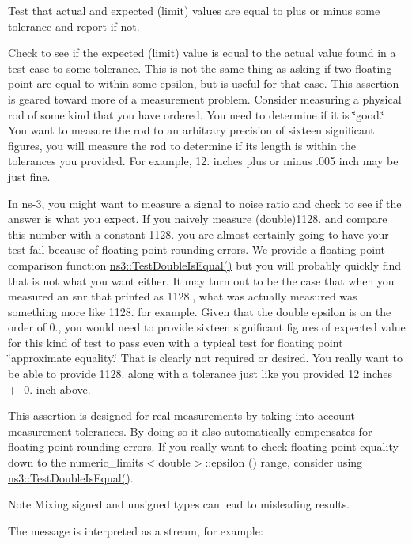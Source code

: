 Test that actual and expected (limit) values are equal to plus or minus some tolerance and report if not. 

Check to see if the expected (limit) value is equal to the actual value found in a test case to some tolerance. This is not the same thing as asking if two floating point are equal to within some epsilon, but is useful for that case. This assertion is geared toward more of a measurement problem. Consider measuring a physical rod of some kind that you have ordered. You need to determine if it is \char`\"{}good.\char`\"{} You want to measure the rod to an arbitrary precision of sixteen significant figures, you will measure the rod to determine if its length is within the tolerances you provided. For example, 12. inches plus or minus .005 inch may be just fine.

In ns-\/3, you might want to measure a signal to noise ratio and check to see if the answer is what you expect. If you naively measure (double)1128. and compare this number with a constant 1128. you are almost certainly going to have your test fail because of floating point rounding errors. We provide a floating point comparison function \hyperlink{group__testing_ga13a5d60f4d34641d7e2fd799f2c4d952}{ns3\+::\+Test\+Double\+Is\+Equal()} but you will probably quickly find that is not what you want either. It may turn out to be the case that when you measured an snr that printed as 1128., what was actually measured was something more like 1128. for example. Given that the double epsilon is on the order of 0., you would need to provide sixteen significant figures of expected value for this kind of test to pass even with a typical test for floating point \char`\"{}approximate
equality.\char`\"{} That is clearly not required or desired. You really want to be able to provide 1128. along with a tolerance just like you provided 12 inches +-\/ 0. inch above.

This assertion is designed for real measurements by taking into account measurement tolerances. By doing so it also automatically compensates for floating point rounding errors. If you really want to check floating point equality down to the numeric\+\_\+limits$<$double$>$\+::epsilon () range, consider using \hyperlink{group__testing_ga13a5d60f4d34641d7e2fd799f2c4d952}{ns3\+::\+Test\+Double\+Is\+Equal()}.

\begin{DoxyNote}{Note}
Mixing signed and unsigned types can lead to misleading results.
\end{DoxyNote}
The message is interpreted as a stream, for example\+:


